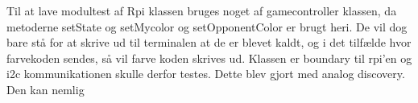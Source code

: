 \documentclass[Modultest/Modultest_main.tex]{subfiles}
\begin{document}
Til at lave modultest af Rpi klassen bruges noget af gamecontroller klassen, da metoderne setState og setMycolor og setOpponentColor er brugt heri. De vil dog bare stå for at skrive ud til terminalen at de er blevet kaldt, og i det tilfælde hvor farvekoden sendes, så vil farve koden skrives ud.
Klassen er boundary til rpi'en og i2c kommunikationen skulle derfor testes. Dette blev gjort med analog discovery. Den kan nemlig
\end{document}

